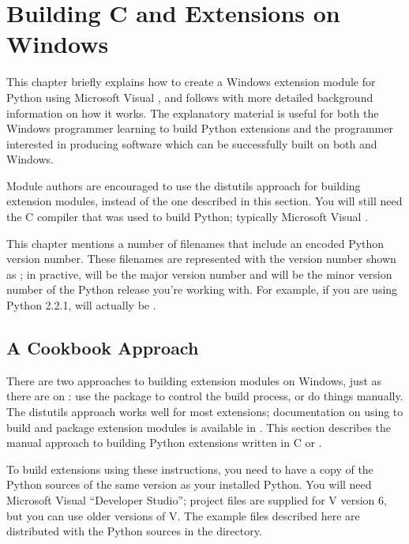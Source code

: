 \chapter{Building C and \Cpp{} Extensions on Windows%
     \label{building-on-windows}}


This chapter briefly explains how to create a Windows extension module
for Python using Microsoft Visual \Cpp, and follows with more
detailed background information on how it works.  The explanatory
material is useful for both the Windows programmer learning to build
Python extensions and the \UNIX{} programmer interested in producing
software which can be successfully built on both \UNIX{} and Windows.

Module authors are encouraged to use the distutils approach for
building extension modules, instead of the one described in this
section. You will still need the C compiler that was used to build
Python; typically Microsoft Visual \Cpp.

\begin{notice}
  This chapter mentions a number of filenames that include an encoded
  Python version number.  These filenames are represented with the
  version number shown as ; in practive,  will
  be the major version number and  will be the minor
  version number of the Python release you're working with.  For
  example, if you are using Python 2.2.1,  will actually be
  .
\end{notice}


\section{A Cookbook Approach \label{win-cookbook}}

There are two approaches to building extension modules on Windows,
just as there are on \UNIX: use the  package to
control the build process, or do things manually.  The distutils
approach works well for most extensions; documentation on using
 to build and package extension modules is
available in .  This section describes the manual approach to building
Python extensions written in C or \Cpp.

To build extensions using these instructions, you need to have a copy
of the Python sources of the same version as your installed Python.
You will need Microsoft Visual \Cpp{} ``Developer Studio''; project
files are supplied for V\Cpp{} version 6, but you can use older
versions of V\Cpp.  The example files described here are distributed
with the Python sources in the  directory.

